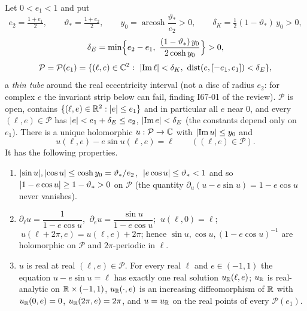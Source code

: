\begin{proposition}\label{bpI:p7:kepler-eq}
Let $0<e_1<1$ and put
\[
e_2=\tfrac{1+e_1}2,\qquad\vartheta_*=\tfrac{1+e_2}2,\qquad y_0=\operatorname{arcosh}\frac{\vartheta_*}{e_2}>0,\qquad\delta_K=\tfrac12(1-\vartheta_*)\,y_0>0,
\]
\[
\delta_E=\min\Bigl\{e_2-e_1,\ \frac{(1-\vartheta_*)\,y_0}{2\cosh y_0}\Bigr\}>0,
\]
\[
\mathcal P=\mathcal P(e_1)=\{(\ell,e)\in\C^2:\ \abs{\operatorname{Im}\ell}<\delta_K,\ \operatorname{dist}(e,[-e_1,e_1])<\delta_E\},
\]
a \emph{thin tube} around the real eccentricity interval (not a disc of radius $e_2$: for complex $e$ the invariant strip below can fail, finding I67-01 of the review). $\mathcal P$ is open, contains $\{(\ell,e)\in\mathbb{R}^2:\lvert e\rvert\le e_1\}$ and in particular all $e$ near $0$, and every $(\ell,e)\in\mathcal P$ has $\lvert e\rvert<e_1+\delta_E\le e_2$, $\lvert \operatorname{Im}e\rvert<\delta_E$ (the constants depend only on $e_1$). There is a unique holomorphic $u:\mathcal P\to\mathbb{C}$ with $\lvert \operatorname{Im}u\rvert\le y_0$ and
\[
u(\ell,e)-e\sin u(\ell,e)=\ell\qquad((\ell,e)\in\mathcal P).
\]
It has the following properties.
\begin{enumerate}[label=(\alph*)]
\item $\lvert \sin u\rvert,\lvert \cos u\rvert\le\cosh y_0=\vartheta_*/e_2$, $\ \lvert e\cos u\rvert\le\vartheta_*<1$ and so $\lvert 1-e\cos u\rvert\ge1-\vartheta_*>0$ on $\mathcal P$ (the quantity $\partial_u(u-e\sin u)=1-e\cos u$ never vanishes).
\item $\partial_\ell u=\dfrac1{1-e\cos u}$, $\ \partial_eu=\dfrac{\sin u}{1-e\cos u}$; $\ u(\ell,0)=\ell$; $\ u(\ell+2\pi,e)=u(\ell,e)+2\pi$; hence $\sin u,\cos u,(1-e\cos u)^{-1}$ are holomorphic on $\mathcal P$ and $2\pi$-periodic in $\ell$.
\item $u$ is real at real $(\ell,e)\in\mathcal P$. For every real $\ell$ and $e\in(-1,1)$ the equation $u-e\sin u=\ell$ has exactly one real solution $u_{\mathbb{R}}(\ell,e)$; $u_{\mathbb{R}}$ is real-analytic on $\mathbb{R}\times(-1,1)$, $u_{\mathbb{R}}(\cdot,e)$ is an increasing diffeomorphism of $\mathbb{R}$ with $u_{\mathbb{R}}(0,e)=0$, $u_{\mathbb{R}}(2\pi,e)=2\pi$, and $u=u_{\mathbb{R}}$ on the real points of every $\mathcal P(e_1)$.
\end{enumerate}
\end{proposition}
